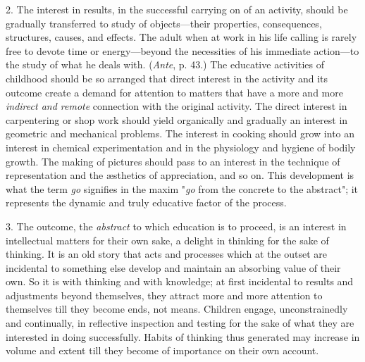 \documentclass[letterpaper]{book}
\begin{document}

2. The interest in results, in the successful carrying on of an
activity, should be gradually transferred to
study
of objects---their properties, consequences, structures, causes, and
effects. The adult when at work in his life calling is rarely free to
devote time or energy---beyond the necessities of his immediate
action---to the study of what he deals with. (\emph{Ante}, p. 43.) The
educative activities of childhood should be so arranged that direct
interest in the activity and its outcome create a demand for attention
to matters that have a more and more \emph{indirect and remote}
connection with the original activity. The direct interest in
carpentering or shop work should yield organically and gradually an
interest in geometric and mechanical problems. The interest in cooking
should grow into an interest in chemical experimentation and in the
physiology and hygiene of bodily growth. The making of pictures should
pass to an interest in the technique of representation and the æsthetics
of appreciation, and so on. This development is what the term \emph{go}
signifies in the maxim "\emph{go} from the concrete to the abstract"; it
represents the dynamic and truly educative factor of the process.


3. The outcome, the \emph{abstract} to which education is to proceed, is
an interest in intellectual matters for their own sake, a delight in
thinking for the sake of thinking. It is an old story that acts and
processes which at the outset are incidental to something else develop
and maintain an absorbing value of their own. So it is with thinking and
with knowledge; at first incidental to results and adjustments beyond
themselves, they attract more and more attention to themselves till they
become ends, not means. Children engage, unconstrainedly and
continually, in reflective inspection and testing for the sake of what
they are interested in doing successfully. Habits of thinking thus
generated may increase in
volume
and extent till they become of importance on their own account.

\end{document}
